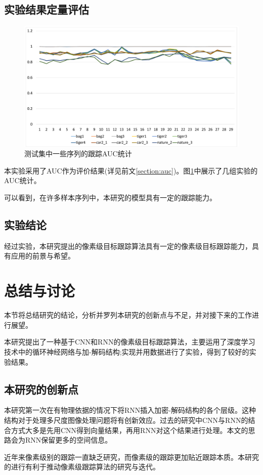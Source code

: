 \subsection{实验结果定量评估}
\par
\begin{figure}
    \centering
    \includegraphics[width = 1.\textwidth]{chap/img/res_auc.pdf}
    \caption{测试集中一些序列的跟踪AUC统计}
    \label{fig:res_auc}
\end{figure}
\par
本实验采用了AUC作为评价结果(详见前文\ref{section:auc})。图\ref{fig:res_auc}中展示了几组实验的AUC统计。
\par
可以看到，在许多样本序列中，本研究的模型具有一定的跟踪能力。
\subsection{实验结论}
经过实验，本研究提出的像素级目标跟踪算法具有一定的像素级目标跟踪能力，具有应用的前景与希望。

\section{总结与讨论}
本节将总结研究的结论，分析并罗列本研究的创新点与不足，并对接下来的工作进行展望。
\par
本研究提出了一种基于CNN和RNN的像素级目标跟踪算法，主要运用了深度学习技术中的循环神经网络与加-解码结构;实现并用数据进行了实验，得到了较好的实验结果。
\subsection{本研究的创新点}
本研究第一次在有物理依据的情况下将RNN插入加密-解码结构的各个层级。这种结构对于处理多尺度图像处理问题将有创新效应。过去的研究中CNN与RNN的结合方式大多是先用CNN得到向量结果，再用RNN对这个结果进行处理。本文的思路会为RNN保留更多的空间信息。
\par
近年来像素级别的跟踪一直缺乏研究，而像素级的跟踪更加贴近跟踪本质。本研究的进行有利于推动像素级跟踪算法的研究与迭代。
